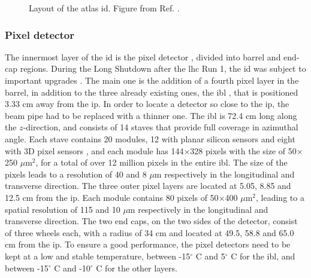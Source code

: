 \begin{figure}[ht]
\centering
{}
\caption{Layout of the \gls{atlas} \gls{id}. Figure from Ref. \cite{Potamianos:2016ptf}.}
\label{fig:atlas:id}
\end{figure}


\subsubsection*{Pixel detector}
\label{sec:atlas:pixel}
The innermost layer of the \gls{id} is the pixel detector \cite{Aad:2008zz}, divided into barrel and end-cap regions. 
During the Long Shutdown after the \gls{lhc} Run 1, the \gls{id} was subject to important upgrades \cite{Potamianos:2016ptf}. 
The main one is the addition of a fourth pixel layer in the barrel, in addition to the three already existing ones, 
the \gls{ibl} \cite{Capeans:1291633}, that is positioned 3.33 cm away from the \gls{ip}. 
In order to locate a detector so close to the \gls{ip}, the beam pipe had to be replaced with a thinner one. 
The \gls{ibl} is 72.4 cm long along the $z$-direction, and consists of 14 staves that provide full coverage in azimuthal angle. Each stave contains 20 modules, 12 with planar silicon sensors and eight with 3D pixel sensors \cite{1748-0221-7-11-P11010}, and each module has 144$\times$328 pixels with the size of 50$\times$250 $\mu$m$^2$, for a total of over 12 million pixels in the entire \gls{ibl}. The size of the pixels leads to a resolution of 40 and 8 $\mu$m respectively in the longitudinal and transverse direction. 
The three outer pixel layers are located at 5.05, 8.85 and 12.5 cm from the \gls{ip}. 
Each module contains 80 pixels of 50$\times$400 $\mu$m$^2$, leading to a spatial resolution of 115 and 10 $\mu$m respectively in the longitudinal and transverse direction. 
The two end caps, on the two sides of the detector, consist of three wheels each, with a radius of 34 cm and located at 49.5, 58.8 and 65.0 cm from the \gls{ip}. 
To ensure a good performance, the pixel detectors need to be kept at a low and stable temperature, 
between -15$^{\circ}$ C and 5$^{\circ}$ C for the \gls{ibl}, and between -15$^{\circ}$ C and -10$^{\circ}$ C for the other layers.

